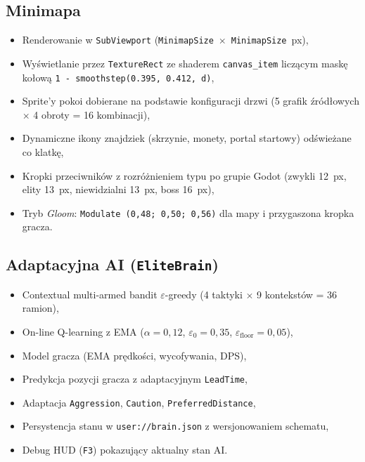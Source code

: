 \subsection{Minimapa}
\begin{itemize}
    \item Renderowanie w \texttt{SubViewport} (\texttt{MinimapSize}~$\times$~\texttt{MinimapSize}~px),
    \item Wyświetlanie przez \texttt{TextureRect} ze shaderem \texttt{canvas\_item} liczącym maskę kołową \texttt{1 - smoothstep(0.395, 0.412, d)},
    \item Sprite'y pokoi dobierane na podstawie konfiguracji drzwi (5 grafik źródłowych $\times$ 4 obroty = 16 kombinacji),
    \item Dynamiczne ikony znajdziek (skrzynie, monety, portal startowy) odświeżane co klatkę,
    \item Kropki przeciwników z rozróżnieniem typu po grupie Godot (zwykli 12~px, elity 13~px, niewidzialni 13~px, boss 16~px),
    \item Tryb \textit{Gloom}: \texttt{Modulate (0,48; 0,50; 0,56)} dla mapy i przygaszona kropka gracza.
\end{itemize}

\subsection{Adaptacyjna AI (\texttt{EliteBrain})}
\begin{itemize}
    \item Contextual multi-armed bandit $\varepsilon$-greedy (4 taktyki $\times$ 9 kontekstów = 36 ramion),
    \item On-line Q-learning z EMA ($\alpha = 0{,}12$, $\varepsilon_0 = 0{,}35$, $\varepsilon_\text{floor} = 0{,}05$),
    \item Model gracza (EMA prędkości, wycofywania, DPS),
    \item Predykcja pozycji gracza z adaptacyjnym \texttt{LeadTime},
    \item Adaptacja \texttt{Aggression}, \texttt{Caution}, \texttt{PreferredDistance},
    \item Persystencja stanu w \texttt{user://brain.json} z wersjonowaniem schematu,
    \item Debug HUD (\texttt{F3}) pokazujący aktualny stan AI.
\end{itemize}

